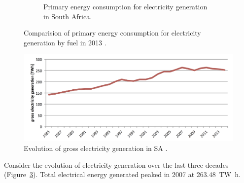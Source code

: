 \begin{figure}[!htbp]
\begin{subfigure}[b]{0.45\textwidth}
                \caption{Primary energy consumption for electricity generation in South Africa.}\label{ElectrSA}
        \end{subfigure}
\caption[Comparision of primary energy consumption for electricity generation by fuel in 2013.]{Comparision of primary energy consumption for electricity generation by fuel in 2013 \cite{Agency2015}.}\label{Electr}
\end{figure}

\begin{figure}[htbp]  
\centering
\includegraphics[width=1\linewidth]{FIG/electrGross}
\caption[Evolution of gross electricity generation in SA.]{Evolution of gross electricity generation in SA \cite{BP2015c}.}\label{electrGross}
\end{figure}
Consider the evolution of electricity generation over the last three decades (Figure~\ref{electrGross}). Total electrical energy generated peaked in 2007 at \SI{263,48}{\tera\watt\hour}. \cite{BP2015c} 

